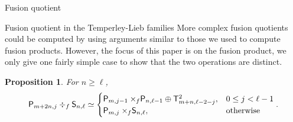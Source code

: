 \documentclass[reqno]{amsart}
\newtheorem{Prop}[Thm]{Proposition}
\newcommand{\ds}[1]{\mathsf S_{#1}}
\newcommand{\dP}[1]{\mathsf P_{#1}}
\newcommand{\xf}{\times\hspace{-0.27em}_f}
\newcommand{\T}[2]{\mathsf{T}^{#1}_{#2}}
\begin{document}
\begin{section}{Fusion quotient}
\begin{subsection}{Fusion quotient in the Temperley-Lieb families}
More complex fusion quotients could be computed by using arguments similar to those we used to compute fusion products. However, the focus of this paper is on the fusion product, we only give one fairly simple case to show that the two operations are distinct.
\begin{Prop}
For $n\geq \ell$,
\begin{equation}
\dP{m+2n, j} \div_{f} \ds{n,\ell} \simeq \begin{cases}
\dP{m,j-1} \xf \dP{n ,\ell -1} \oplus \T{2}{m+n, \ell -2- j}, & 0\leq j < \ell -1\\
\dP{m,j}\xf \ds{n,\ell}, & \text{otherwise}
\end{cases}.
\end{equation}
\end{Prop}
\end{subsection}
\end{section}
\end{document}

